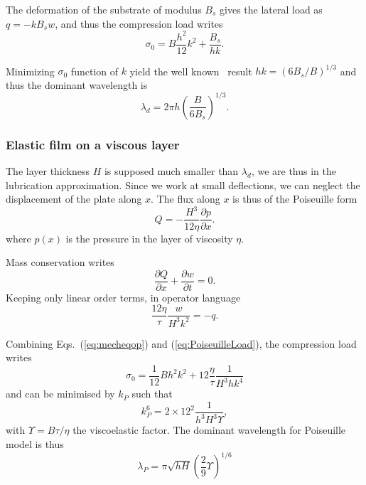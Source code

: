 \documentclass[twocolumn,superscriptaddress,showpacs,preprintnumbers,
amsmath,amssymb,prl]{revtex4-1}
\begin{document}
The deformation of the substrate of modulus $B_s$ gives the lateral load as $q = -k B_s w$, and thus the compression load writes
\begin{equation}
\sigma_0 = B \frac{h^2}{12} k^2 + \frac{B_s}{hk}.
\label{eq:sigma0}
\end{equation}

Minimizing $\sigma_0$ function of $k$ yield the well known~\cite{Biot1957,Cerda2003} result $hk = \left(6B_s/B\right)^{1/3}$ and thus the dominant wavelength is
\begin{equation}
\lambda_d = 2\pi h \left(\frac{B}{6B_s}\right)^{1/3}.
\label{eq:lambdaElEl}
\end{equation}

\subsubsection*{Elastic film on a viscous layer}
The layer thickness $H$ is supposed much smaller than $\lambda_d$, we are thus in the lubrication approximation. Since we work at small deflections, we can neglect the displacement of the plate along $x$. The flux along $x$ is thus of the Poiseuille form
\begin{equation}
Q = -\frac{H^3}{12\eta}\frac{\partial p}{\partial x}.
\label{eq:PoiseuilleFlux}
\end{equation}
where $p(x)$ is the pressure in the layer of viscosity $\eta$.

Mass conservation writes
\begin{equation}
\frac{\partial Q}{\partial x} + \frac{\partial w}{\partial t} = 0.
\label{eq:conservation}
\end{equation}
Keeping only linear order terms, in operator language
\begin{equation}
\frac{12\eta}{\tau} \frac{w}{H^3k^2} = -q.
\label{eq:PoiseuilleLoad}
\end{equation}

Combining Eqs.~(\ref{eq:mecheqop}) and (\ref{eq:PoiseuilleLoad}), the compression load writes
\begin{equation}
\sigma_0 = \frac{1}{12}B h^2 k^2 + 12\frac{\eta}{\tau}\frac{1}{H^3 h k^4}
\label{eq:sigma0P}
\end{equation}
and can be minimised by $k_P$ such that
\begin{equation}
k_P^6 = 2\times 12^2 \frac{1}{h^3H^3\Upsilon},
\label{eq:kP}
\end{equation}
with $\Upsilon = B\tau/\eta$ the viscoelastic factor. The dominant wavelength for Poiseuille model is thus
\begin{equation}
\lambda_P = \pi\sqrt{hH}\left(\frac{2}{9}\Upsilon\right)^{1/6}
\end{equation}
\end{document}
